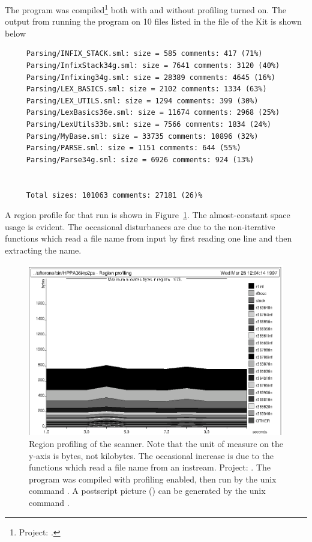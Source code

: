 \documentclass[12pt]{book}
\begin{document}
The program was compiled\footnote{Project: .} both
with and without profiling turned on. The output from running the
program on 10 files listed in the 
file of the Kit is shown below
\begin{verbatim}
     Parsing/INFIX_STACK.sml: size = 585 comments: 417 (71%)
     Parsing/InfixStack34g.sml: size = 7641 comments: 3120 (40%)
     Parsing/Infixing34g.sml: size = 28389 comments: 4645 (16%)
     Parsing/LEX_BASICS.sml: size = 2102 comments: 1334 (63%)
     Parsing/LEX_UTILS.sml: size = 1294 comments: 399 (30%)
     Parsing/LexBasics36e.sml: size = 11674 comments: 2968 (25%)
     Parsing/LexUtils33b.sml: size = 7566 comments: 1834 (24%)
     Parsing/MyBase.sml: size = 33735 comments: 10896 (32%)
     Parsing/PARSE.sml: size = 1151 comments: 644 (55%)
     Parsing/Parse34g.sml: size = 6926 comments: 924 (13%)


     Total sizes: 101063 comments: 27181 (26)%
\end{verbatim}
A region profile for that run is shown in Figure~\ref{scan.fig}.  The
almost-constant space usage is evident. The occasional disturbances
are due to the non-iterative functions which read a file name from
input by first reading one line and then extracting the name.
\begin{figure}
\begin{center}
\includegraphics{scan.ps}
\end{center}
\caption{Region profiling of the scanner. Note that the unit of measure on 
the y-axis is bytes, not kilobytes. The occasional increase is due to the
functions which read a file name from an instream. Project: .
The program was compiled with profiling enabled, then run by the
unix command . A postscript
picture () can be generated by the unix command
.
}
\label{scan.fig}
\end{figure}
%
%
\end{document}
